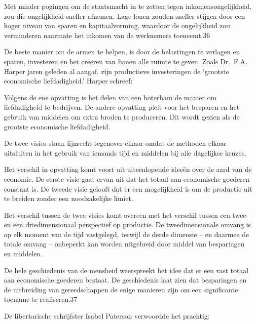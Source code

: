 \documentclass[
  a5paper,
  smalldemyvopaper,10pt,twoside,onecolumn,openright,extrafontsizes,hidelinks]{memoir}
\renewenvironment{quote}%
               {\list{}{\rightmargin=.6cm\leftmargin=.6cm}%
                \itshape \item[]}%
               {\endlist}
\begin{document}
\begin{quote}
Met minder pogingen om de staatsmacht in te zetten tegen
inkomensongelijkheid, zou die ongelijkheid sneller afnemen. Lage lonen
zouden sneller stijgen door een hoger niveau van sparen en
kapitaalvorming, waardoor de ongelijkheid zou verminderen naarmate het
inkomen van de werknemers toeneemt.36
\end{quote}

De beste manier om de armen te helpen, is door de belastingen te
verlagen en sparen, investeren en het creëren van banen alle ruimte te
geven. Zoals Dr.~F.A. Harper jaren geleden al aangaf, zijn productieve
investeringen de `grootste economische liefdadigheid.' Harper schreef:

\begin{quote}
Volgens de ene opvatting is het delen van een boterham de manier om
liefdadigheid te bedrijven. De andere opvatting pleit voor het besparen
en het gebruik van middelen om extra broden te produceren. Dit wordt
gezien als de grootste economische liefdadigheid.

De twee visies staan lijnrecht tegenover elkaar omdat de methoden elkaar
uitsluiten in het gebruik van iemands tijd en middelen bij alle
dagelijkse keuzes.

Het verschil in opvatting komt voort uit uiteenlopende ideeën over de
aard van de economie. De eerste visie gaat ervan uit dat het totaal aan
economische goederen constant is. De tweede visie gelooft dat er een
mogelijkheid is om de productie uit te breiden zonder een noodzakelijke
limiet.

Het verschil tussen de twee visies komt overeen met het verschil tussen
een twee- en een driedimensionaal perspectief op productie. De
tweedimensionale omvang is op elk moment van de tijd vastgelegd, terwijl
de derde dimensie -- en daarmee de totale omvang -- onbeperkt kan worden
uitgebreid door middel van besparingen en middelen.

De hele geschiedenis van de mensheid weerspreekt het idee dat er een
vast totaal aan economische goederen bestaat. De geschiedenis laat zien
dat besparingen en de uitbreiding van gereedschappen de enige manieren
zijn om een significante toename te realiseren.37
\end{quote}

De libertarische schrijfster Isabel Paterson verwoordde het prachtig:
\end{document}
